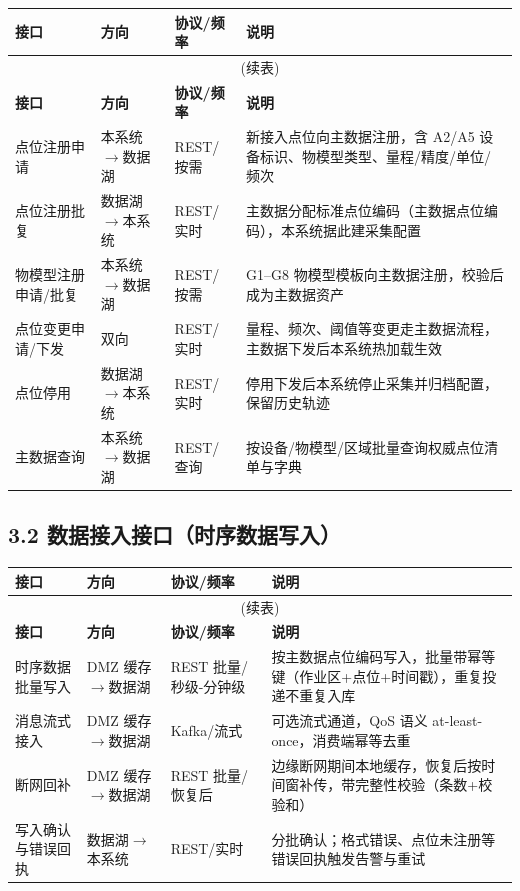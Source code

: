 \documentclass[11pt,a4paper]{ctexart}
\begin{document}
\begin{longtable}{p{3.6cm} p{3.2cm} p{1.9cm} p{3.4cm}}
\toprule
\textbf{接口} & \textbf{方向} & \textbf{协议/频率} & \textbf{说明} \\
\midrule
\endfirsthead
\multicolumn{4}{c}{(续表)} \\
\toprule
\textbf{接口} & \textbf{方向} & \textbf{协议/频率} & \textbf{说明} \\
\midrule
\endhead
点位注册申请 & 本系统$\rightarrow$数据湖 & REST/按需 & 新接入点位向主数据注册，含 A2/A5 设备标识、物模型类型、量程/精度/单位/频次 \\
点位注册批复 & 数据湖$\rightarrow$本系统 & REST/实时 & 主数据分配标准点位编码（主数据点位编码），本系统据此建采集配置 \\
物模型注册申请/批复 & 本系统$\rightarrow$数据湖 & REST/按需 & G1--G8 物模型模板向主数据注册，校验后成为主数据资产 \\
点位变更申请/下发 & 双向 & REST/实时 & 量程、频次、阈值等变更走主数据流程，主数据下发后本系统热加载生效 \\
点位停用 & 数据湖$\rightarrow$本系统 & REST/实时 & 停用下发后本系统停止采集并归档配置，保留历史轨迹 \\
主数据查询 & 本系统$\rightarrow$数据湖 & REST/查询 & 按设备/物模型/区域批量查询权威点位清单与字典 \\
\bottomrule
\end{longtable}

\subsection{3.2 数据接入接口（时序数据写入）}

\begin{longtable}{p{3.6cm} p{3.2cm} p{1.9cm} p{3.4cm}}
\toprule
\textbf{接口} & \textbf{方向} & \textbf{协议/频率} & \textbf{说明} \\
\midrule
\endfirsthead
\multicolumn{4}{c}{(续表)} \\
\toprule
\textbf{接口} & \textbf{方向} & \textbf{协议/频率} & \textbf{说明} \\
\midrule
\endhead
时序数据批量写入 & DMZ 缓存$\rightarrow$数据湖 & REST 批量/秒级-分钟级 & 按主数据点位编码写入，批量带幂等键（作业区+点位+时间戳），重复投递不重复入库 \\
消息流式接入 & DMZ 缓存$\rightarrow$数据湖 & Kafka/流式 & 可选流式通道，QoS 语义 at-least-once，消费端幂等去重 \\
断网回补 & DMZ 缓存$\rightarrow$数据湖 & REST 批量/恢复后 & 边缘断网期间本地缓存，恢复后按时间窗补传，带完整性校验（条数+校验和） \\
写入确认与错误回执 & 数据湖$\rightarrow$本系统 & REST/实时 & 分批确认；格式错误、点位未注册等错误回执触发告警与重试 \\
\bottomrule
\end{longtable}
\end{document}

